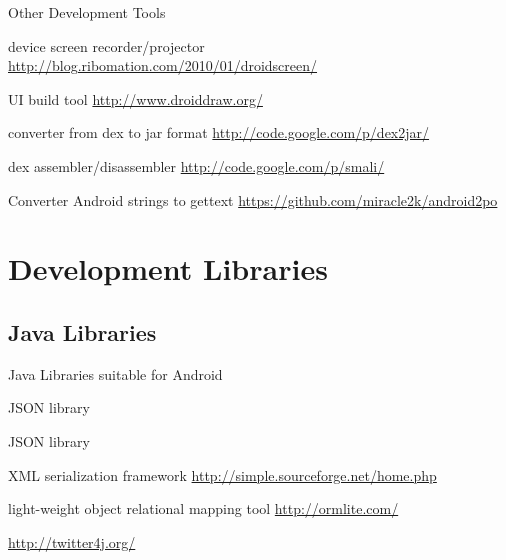 \documentclass[aspectratio=169]{beamer}
\newcommand{\surl}[1] {{\tiny \url{#1}}}
\begin{document}
    \begin{frame}{Other Development Tools}
      \begin{description}
        \item<1->[Droid at Screen] device screen recorder/projector \surl{http://blog.ribomation.com/2010/01/droidscreen/}

        \item<2->[DroidDraw] UI build tool \surl{http://www.droiddraw.org/}
 
        \item<3->[dex2jar] converter from dex to jar format \surl{http://code.google.com/p/dex2jar/}

        \item<4->[smali/baksmali] dex assembler/disassembler \surl{http://code.google.com/p/smali/}

        \item<5->[Android2PO] Converter Android strings to gettext \surl{https://github.com/miracle2k/android2po}
      \end{description}
   \end{frame}

\section{Development Libraries}

  \subsection{Java Libraries}

    \begin{frame}{Java Libraries suitable for Android}
      \begin{description}
        \item<1->[jackson] JSON library 
        \item<2->[gson] JSON library
        
        \item<3->[SimpleXML] XML serialization framework \surl{http://simple.sourceforge.net/home.php}

        \item<4->[ormlite] light-weight object relational mapping tool \surl{http://ormlite.com/}

        \item<5->[Twitter4J] \surl{http://twitter4j.org/}

        
      \end{description}
    \end{frame}
\end{document}
